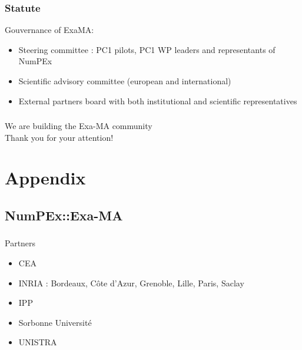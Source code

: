 \begin{frame}
  \frametitle{Statute}
  
  Gouvernance of ExaMA:
  \begin{itemize}
    \item Steering committee : PC1 pilots, PC1 WP leaders and representants of NumPEx 
    \item Scientific advisory committee (european and international)
    \item \alert{External partners board with both institutional and scientific representatives}
  \end{itemize}

\end{frame}


\begin{frame}
  \frametitle{}
  \framesubtitle{}

  \begin{center}
    \LARGE We are building the Exa-MA community \\[1cm]

    Thank you for your attention!
  \end{center}
  
  

\end{frame}

\appendix
\section{Appendix}
\subsection{NumPEx::Exa-MA}

\begin{frame}
  \frametitle{\insertsectionhead}
  \framesubtitle{\insertsubsectionhead}

  Partners
  \begin{itemize}
    \item CEA 
    \item INRIA : Bordeaux,  Côte d'Azur, Grenoble, Lille, Paris, Saclay
    \item IPP 
    \item Sorbonne Université 
    \item UNISTRA  
  \end{itemize}
\end{frame}


